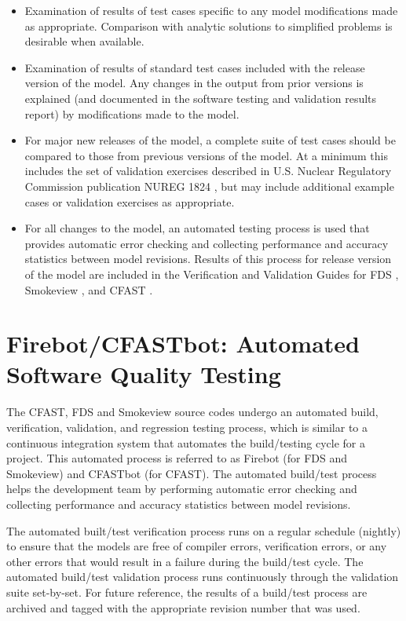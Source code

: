 \documentclass[11pt]{book}
\begin{document}
\begin{itemize}
\item Examination of results of test cases specific to any model modifications made as appropriate.  Comparison with analytic solutions to simplified problems is desirable when available.

\item Examination of results of standard test cases included with the release version of the model. Any changes in the output from prior versions is explained (and documented in the software testing and validation results report) by modifications made to the model.

\item For major new releases of the model, a complete suite of test cases should be compared to those from previous versions of the model.  At a minimum this includes the set of validation exercises described in U.S. Nuclear Regulatory Commission publication NUREG 1824 \cite{NUREG_1824, NUREG_1824_Sup_1}, but may include additional example cases or validation exercises as appropriate.

\item For all changes to the model, an automated testing process is used that provides automatic error checking and collecting performance and accuracy statistics between model revisions. Results of this process for release version of the model are included in the Verification and Validation Guides for FDS \cite{FDS_Validation_Guide, FDS_Verification_Guide}, Smokeview \cite{Smokeview_Verification_Guide}, and CFAST \cite{CFAST_Valid_Guide_7}.
\end{itemize}


\section{Firebot/CFASTbot: Automated Software Quality Testing}

The CFAST, FDS and Smokeview source codes undergo an automated build, verification, validation, and regression testing process, which is similar to a continuous integration system that automates the build/testing cycle for a project. This automated process is referred to as Firebot (for FDS and Smokeview) and CFASTbot (for CFAST). The automated build/test process helps the development team by performing automatic error checking and collecting performance and accuracy statistics between model revisions.

The automated built/test verification process runs on a regular schedule (nightly) to ensure that the models are free of compiler errors, verification errors, or any other errors that would result in a failure during the build/test cycle. The automated build/test validation process runs continuously through the validation suite set-by-set. For future reference, the results of a build/test process are archived and tagged with the appropriate revision number that was used.
\end{document}
